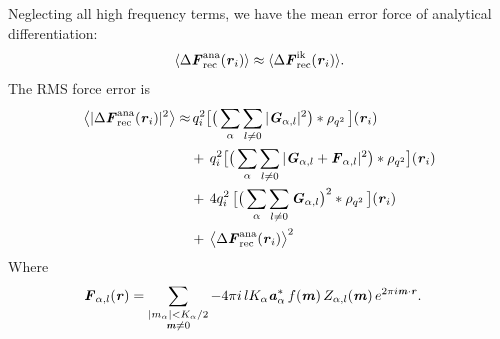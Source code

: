\documentclass[aps,pre,preprint,unsortedaddress]{revtex4}
\renewcommand{\v}[1]{\textbf{\textit{#1}}}
\begin{document}
Neglecting all high frequency terms, we have the mean error force of
analytical differentiation:
\begin{align}\label{eqn:ana.meanf}
  \langle \Delta\v F_{\textrm{rec}}^{\textrm{ana}}(\v r_i)\rangle
  \approx
  \langle \Delta\v F_{\textrm{rec}}^{\textrm{ik}}(\v r_i)\rangle.
\end{align}
The RMS force error is 
\begin{align}\nonumber
  \big\langle
  \vert \Delta\v F_{\textrm{rec}}^{\textrm{ana}}(\v r_i)\vert^2
  \big\rangle
  \approx&\,
  q_i^2
  \big[
  \big(
  \sum_{\alpha} \sum_{l\neq 0}
  \vert \v G_{\alpha,l}\vert^2
  \big)
  \ast \rho_{q^2}
  \,\big] (\v r_i) \\\nonumber
  & +\,
  q_i^2
  \big[
  \big(
  \sum_{\alpha}\sum_{l\neq 0}
  \vert
  \v G_{\alpha,l} + \v F_{\alpha,l}\vert^2
  \big)
  \ast \rho_{q^2}
  \big]
  (\v r_i) \\ \nonumber
  & +\,
  4q_i^2\,
  \big[
  \big(
  \sum_{\alpha} \sum_{l\neq 0}  
  \v G_{\alpha,l}
  \big)^2
  \ast \rho_{q^2}\,
  \big] (\v r_i) \\\label{eqn:ana.error}
  & +\,
  \big\langle \Delta\v F_{\textrm{rec}}^{\textrm{ana}}(\v r_i)\big\rangle ^2
\end{align}
Where
\begin{align}
  \v F_{\alpha,l} (\v r)
  &=
  \sum_{
    \begin{subarray}{c}
      \vert m_{\alpha}\vert < K_\alpha/2\\
      \v m\neq 0
    \end{subarray}}
  -4 \pi i\, l K_\alpha \v a^\ast_\alpha\,f(\v m)\,
  Z_{\alpha,l}(\v m)\,
  e^{2\pi i\v m\cdot \v r}.
\end{align}
\end{document}
